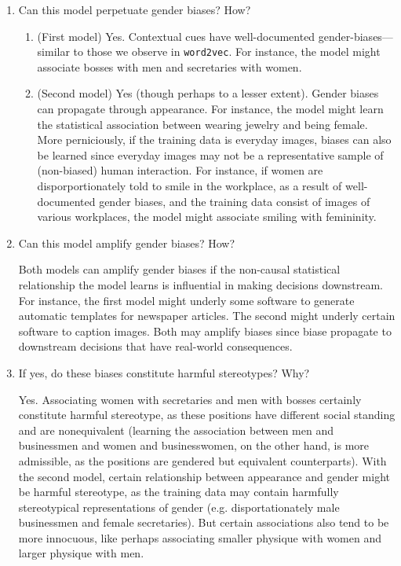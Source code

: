 \documentclass[12pt]{article}
\begin{document}
\begin{enumerate}
    \item Can this model perpetuate gender biases? How?
    \begin{enumerate}
        \item (First model) Yes. Contextual cues have well-documented gender-biases---similar to those we observe in \texttt{word2vec}. For instance, the model might associate bosses with men and secretaries with women. 
        \item (Second model) Yes (though perhaps to a lesser extent). Gender biases can propagate through appearance. For instance, the model might learn the statistical association between wearing jewelry and being female. More perniciously, if the training data is everyday images, biases can also be learned since everyday images may not be a representative sample of (non-biased) human interaction. For instance, if women are disporportionately told to smile in the workplace, as a result of well-documented gender biases, and the training data consist of images of various workplaces, the model might associate smiling with femininity. 
    \end{enumerate}
    \item Can this model amplify gender biases? How?
    
    Both models can amplify gender biases if the non-causal statistical relationship the model learns is influential in making decisions downstream. For instance, the first model might underly some software to generate automatic templates for newspaper articles. The second might underly certain software to caption images. Both may amplify biases since biase propagate to downstream decisions that have real-world consequences. 
    
    \item If yes, do these biases constitute harmful stereotypes? Why?
    
    Yes. Associating women with secretaries and men with bosses certainly constitute harmful stereotype, as these positions have different social standing and are nonequivalent (learning the association between men and businessmen and women and businesswomen, on the other hand, is more admissible, as the positions are gendered but equivalent counterparts). With the second model, certain relationship between appearance and gender might be harmful stereotype, as the training data may contain harmfully stereotypical representations of gender (e.g. disportationately male businessmen and female secretaries). But certain associations also tend to be more innocuous, like perhaps associating smaller physique with women and larger physique with men.
    

\end{enumerate}
\end{document}
